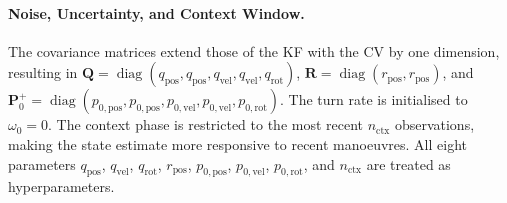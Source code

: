 \paragraph{Noise, Uncertainty, and Context Window.}
The covariance matrices extend those of the \ac{KF} with the \ac{CV} by one dimension, resulting in $\mathbf{Q} = \operatorname{diag}(q_\text{pos}, q_\text{pos}, q_\text{vel}, q_\text{vel}, q_\text{rot})$, $\mathbf{R} = \operatorname{diag}(r_\text{pos}, r_\text{pos})$, and $\mathbf{P}^+_0 = \operatorname{diag}(p_{0,\text{pos}}, p_{0,\text{pos}}, p_{0,\text{vel}}, p_{0,\text{vel}}, p_{0,\text{rot}})$. 
The turn rate is initialised to $\omega_0 = 0$. The context phase is restricted to the most recent $n_\text{ctx}$ observations, making the state estimate more responsive to recent manoeuvres. All eight parameters $q_\text{pos}$, $q_\text{vel}$, $q_\text{rot}$, $r_\text{pos}$, $p_{0,\text{pos}}$, $p_{0,\text{vel}}$, $p_{0,\text{rot}}$, and $n_\text{ctx}$ are treated as hyperparameters.


    